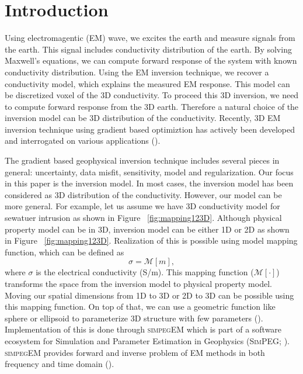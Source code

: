\documentclass{segabs}
\newcommand{\SimPEG}{\textsc{SimPEG}\xspace}
\newcommand{\simpegEM}{\textsc{simpegEM}\xspace}
\begin{document}
\section{Introduction}
Using electromagentic (EM) wave, we excites the earth and measure signals from the earth.
This signal includes conductivity distribution of the earth. By solving Maxwell's
equations, we can compute forward response of the system with known conductivity
distribution.
Using the EM inversion technique, we recover a conductivity model, which explains the
measured EM response.
This model can be discretized voxel of the 3D conductivity.
To proceed this 3D inversion, we need to compute forward response from the 3D earth.
Therefore a natural choice of the inversion model can be 3D distribution of the conductivity.
Recently, 3D EM inversion technique using gradient based optimiztion has actively been
developed and interrogated on various applications (\cite{Doug2013,Gribenko2007,Chung2014}).

The gradient based geophysical inversion technique includes several pieces in general:
uncertainty, data misfit, sensitivity, model and regularization.
Our focus in this paper is the inversion model.
In most cases, the inversion model has been considered as 3D distribution of the conductivity.
However, our model can be more general. For example, let us assume we have 3D conductivity
model for sewatuer intrusion as shown in Figure ~\ref{fig:mapping123D}.
Although physical property model can be in 3D, inversion model can be either 1D or 2D
as shown in Figure ~\ref{fig:mapping123D}.
Realization of this is possible using model mapping function, which can be defined as
\begin{equation}
  \sigma  = \mathcal{M}[m],
\end{equation}
where $\sigma$ is the electrical conductivity (S/m). This mapping function
($\mathcal{M}[\cdot]$) transforms the space from the inversion model to physical property
model. Moving our spatial dimensions from 1D to 3D or 2D to 3D can be possible using this
mapping function. On top of that, we can use a geometric function like sphere or
ellipsoid to parameterize 3D structure with few parameters (\cite{MikeParam2014}).
Implementation of this is done through \simpegEM which is part of a software ecosystem
for Simulation and Parameter Estimation in Geophysics (\SimPEG; \cite{SimPEG}).
\simpegEM provides forward and inverse problem of EM methods in both frequency and time domain (\cite{SimPEGEM}).
\end{document}
